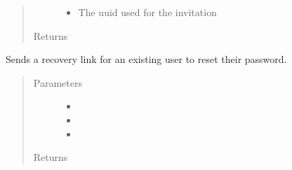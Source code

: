 \documentclass[letterpaper,10pt,english]{sphinxmanual}
\begin{document}
\begin{fulllineitems}
\begin{fulllineitems}
\begin{quote}
\begin{description}
\begin{itemize}
\item {} 
 \textendash{} The uuid used for the invitation

\end{itemize}

\item[{Returns}] \leavevmode


\end{description}\end{quote}

\end{fulllineitems}


\begin{fulllineitems}
\label{\detokenize{apidoc/utdesign_procurement:utdesign_procurement.emailer.EmailHandler.userForgotPassword}}
Sends a recovery link for an existing user to reset their password.
\begin{quote}\begin{description}
\item[{Parameters}] \leavevmode\begin{itemize}
\item {} 
 \textendash{} 

\item {} 
 \textendash{} 

\item {} 
 \textendash{} 

\end{itemize}

\item[{Returns}] \leavevmode


\end{description}\end{quote}

\end{fulllineitems}


\end{fulllineitems}

\end{document}
